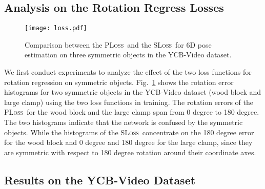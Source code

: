 \documentclass[conference]{IEEEtran}
\newcommand{\sloss}{\textsc{SLoss}}
\newcommand{\pl}{\textsc{PLoss}}
\begin{document}
\subsection{Analysis on the Rotation Regress Losses}


\begin{figure}
	\centering
	\texttt{[image: loss.pdf]}
	\caption{Comparison between the \pl\ and the \sloss\ for 6D pose estimation on three symmetric objects in the YCB-Video dataset.}
	\label{fig:loss}
	\vspace{-6mm}
\end{figure}

We first conduct experiments to analyze the effect of the two loss functions for rotation regression on symmetric objects. Fig.~\ref{fig:loss} shows the rotation error histograms for two symmetric objects in the YCB-Video dataset (wood block and large clamp) using the two loss functions in training. The rotation errors of the \pl\ for the wood block and the large clamp span from 0 degree to 180 degree. The two histograms indicate that the network is confused by the symmetric objects. While the histograms of the \sloss\ concentrate on the 180 degree error for the wood block and 0 degree and 180 degree for the large clamp, since they are symmetric with respect to 180 degree rotation around their coordinate axes.

\subsection{Results on the YCB-Video Dataset}
\end{document}

